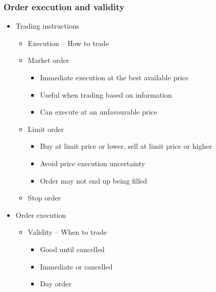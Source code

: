 \documentclass[../notes_compiled.tex]{subfiles}
\begin{document}
\subsubsection{Order execution and validity}
\begin{itemize}
\item Trading instructions
\begin{itemize}
\item Execution -- How to trade
\item Market order
\begin{itemize}
\item Immediate execution at the best available price
\item Useful when trading based on information
\item Can execute at an unfavourable price
\end{itemize}

\item Limit order
\begin{itemize}
\item Buy at limit price or lower, sell at limit price or higher
\item Avoid price execution uncertainty
\item Order may not end up being filled
\end{itemize}

\item Stop order


\end{itemize}

\item Order execution
\begin{itemize}
\item Validity -- When to trade
\begin{itemize}
\item Good until cancelled
\item Immediate or cancelled
\item Day order
\end{itemize}


\end{itemize}
\end{itemize}
\end{document}
